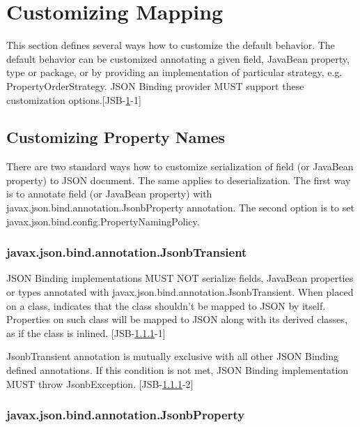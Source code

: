 \chapter{Customizing Mapping}
\label{customization}

This section defines several ways how to customize the default behavior. The default behavior can be customized annotating a given field, JavaBean property, type or package, or by providing an implementation of particular strategy, e.g. PropertyOrderStrategy. JSON Binding provider MUST support these customization options.[JSB-\ref{customization}-1]

\section{Customizing Property Names}
\label{sec:custom_property_names}

There are two standard ways how to customize serialization of field (or JavaBean property) to JSON document. The same applies to deserialization. The first way is to annotate field (or JavaBean property) with javax.json.bind.annotation.JsonbProperty annotation. The second option is to set javax.json.bind.config.PropertyNamingPolicy.

\subsection{javax.json.bind.annotation.JsonbTransient}
\label{subsec:JsonbTransient}

JSON Binding implementations MUST NOT serialize fields,  JavaBean properties or types annotated with javax.json.bind.annotation.JsonbTransient. When placed on a class, indicates that the class shouldn't be mapped to JSON by itself. Properties on such class will be mapped to JSON along with its derived classes, as if the class is inlined. [JSB-\ref{subsec:JsonbTransient}-1]

JsonbTransient annotation is mutually exclusive with all other JSON Binding defined annotations. If this condition is not met, JSON Binding implementation MUST throw JsonbException. [JSB-\ref{subsec:JsonbTransient}-2]

\subsection{javax.json.bind.annotation.JsonbProperty}
\label{subsec:JsonbProperty}

